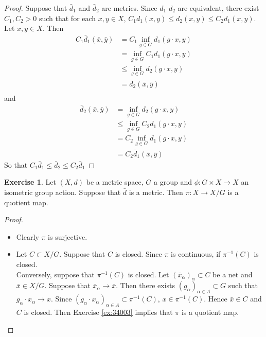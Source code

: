 \documentclass[12pt]{amsart}
\theoremstyle{definition}
\newtheorem{ex}[definition]{Exercise}
\newcommand{\al}{\alpha}
\DeclareMathOperator*{\0}{\mbf{0}}
\DeclareMathOperator*{\1}{\mbf{1}}
\newcommand{\rex}[1]{Exercise \ref{ex:#1}}
\begin{document}
	\begin{proof} Suppose that $\bar{d}_1$ and $\bar{d}_2$  are metrics. Since $d_1$ $d_2$ are equivalent, there exist $C_1, C_2 >0$ such that for each $x,y \in X$, $C_1d_1(x,y) \leq d_2(x,y) \leq C_2d_1(x,y)$. Let $x,y \in X$. Then
	\begin{align*}
	C_1\bar{d}_1(\bar{x}, \bar{y}) 
	&= C_1 \inf_{g \in G} d_1(g \cdot x, y) \\
	&=  \inf_{g \in G} C_1 d_1(g \cdot x, y) \\
	&\leq \inf_{g \in G} d_2(g \cdot x, y) \\
	&= \bar{d}_2(\bar{x}, \bar{y}) \\
	\end{align*}	 
	and 
	\begin{align*}
	\bar{d}_2(\bar{x}, \bar{y}) 
	&= \inf_{g \in G} d_2(g \cdot x, y) \\	
	& \leq \inf_{g \in G} C_2 d_1(g \cdot x, y) \\
	&= C_2 \inf_{g \in G}  d_1(g \cdot x, y) \\
	&= C_2 \bar{d}_1(\bar{x}, \bar{y})
	\end{align*}
	So that $C_1 \bar{d}_1 \leq \bar{d}_2 \leq C_2 \bar{d}_1$
	\end{proof}
	
	\begin{ex}
	Let $(X,d)$ be a metric space, $G$ a group and $\phi: G \times X \rightarrow X$ an isometric group action. Suppose that $\bar{d}$ is a metric. Then $\pi:X \rightarrow X/G$ is a quotient map.
	\end{ex}
	
	\begin{proof}\
	\begin{itemize}
	\item Clearly $\pi$ is surjective. 
	\item Let $C \subset X/G$. Suppose that $C$ is closed. Since $\pi$ is continuous, if $\pi^{-1}(C)$ is closed. \\
	Conversely, suppose that $\pi^{-1}(C)$ is closed. Let $(\bar{x}_{\al})_{\al} \subset C$ be a net and $\bar{x} \in X/G$. Suppose that $\bar{x}_{\al} \rightarrow \bar{x}$. Then there exists $(g_{\al})_{\al \in A} \subset G$ such that $g_{\al} \cdot x_{\al} \rightarrow x$. Since $(g_{\al} \cdot x_{\al})_{\al \in A} \subset \pi^{-1}(C)$, $x \in \pi^{-1}(C)$. Hence $\bar{x} \in C$ and $C$ is closed. Then \rex{34003} implies that $\pi$ is a quotient map.
	\end{itemize}
	\end{proof}
	
\end{document}
